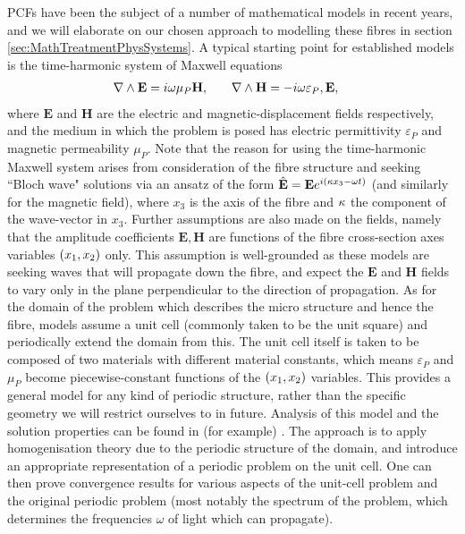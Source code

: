 PCFs have been the subject of a number of mathematical models in recent years, and we will elaborate on our chosen approach to modelling these fibres in section \ref{sec:MathTreatmentPhysSystems}. 
A typical starting point for established models is the time-harmonic system of Maxwell equations
\begin{align*}
	\nabla\wedge\mathbf{E} &= i\omega\mu_{P}\mathbf{H}, &\quad \nabla\wedge\mathbf{H} &= -i\omega\varepsilon_{P},\mathbf{E},
\end{align*} 
where $\mathbf{E}$ and $\mathbf{H}$ are the electric and magnetic-displacement fields respectively, and the medium in which the problem is posed has electric permittivity $\varepsilon_{P}$ and magnetic permeability $\mu_{P}$. 
Note that the reason for using the time-harmonic Maxwell system arises from consideration of the fibre structure and seeking ``Bloch wave" solutions via an ansatz of the form $\hat{\mathbf{E}}=\mathbf{E}e^{i\left( \kappa x_3-\omega t \right)}$ (and similarly for the magnetic field), where $x_3$ is the axis of the fibre and $\kappa$ the component of the wave-vector in $x_3$.
Further assumptions are also made on the fields, namely that the amplitude coefficients $\mathbf{E},\mathbf{H}$ are functions of the fibre cross-section axes variables $\left( x_1,x_2 \right)$ only.
This assumption is well-grounded as these models are seeking waves that will propagate down the fibre, and expect the $\mathbf{E}$ and $\mathbf{H}$ fields to vary only in the plane perpendicular to the direction of propagation.
As for the domain of the problem which describes the micro structure and hence the fibre, models assume a unit cell (commonly taken to be the unit square) and periodically extend the domain from this.
The unit cell itself is taken to be composed of two materials with different material constants, which means $\varepsilon_{P}$ and $\mu_{P}$ become piecewise-constant functions of the $\left( x_1,x_2 \right)$ variables.
This provides a general model for any kind of periodic structure, rather than the specific geometry we will restrict ourselves to in future.
Analysis of this model and the solution properties can be found in (for example) \cite{cooper2014bandgaps}.
The approach is to apply homogenisation theory due to the periodic structure of the domain, and introduce an appropriate representation of a periodic problem on the unit cell.
One can then prove convergence results for various aspects of the unit-cell problem and the original periodic problem (most notably the spectrum of the problem, which determines the frequencies $\omega$ of light which can propagate). \newline

